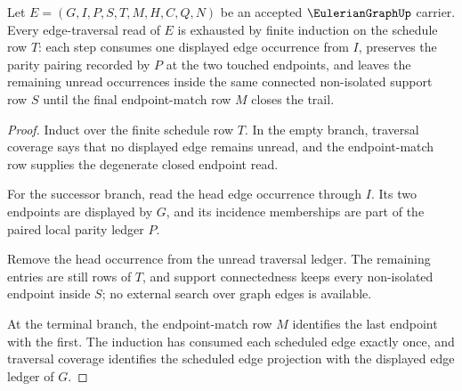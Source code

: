 \begin{theorem}
\label{thm:eulerian-graph-even-degree-trail-exhaustion}
Let $E=(G,I,P,S,T,M,H,C,Q,N)$ be an accepted $\EulerianGraphUp$ carrier. Every edge-traversal read of $E$ is exhausted by finite induction on the schedule row $T$: each step consumes one displayed edge occurrence from $I$, preserves the parity pairing recorded by $P$ at the two touched endpoints, and leaves the remaining unread occurrences inside the same connected non-isolated support row $S$ until the final endpoint-match row $M$ closes the trail.
\end{theorem}
\begin{proof}
Induct over the finite schedule row $T$. In the empty branch, traversal coverage says that no displayed edge remains unread, and the endpoint-match row supplies the degenerate closed endpoint read.

For the successor branch, read the head edge occurrence through $I$. Its two endpoints are displayed by $G$, and its incidence memberships are part of the paired local parity ledger $P$.

Remove the head occurrence from the unread traversal ledger. The remaining entries are still rows of $T$, and support connectedness keeps every non-isolated endpoint inside $S$; no external search over graph edges is available.

At the terminal branch, the endpoint-match row $M$ identifies the last endpoint with the first. The induction has consumed each scheduled edge exactly once, and traversal coverage identifies the scheduled edge projection with the displayed edge ledger of $G$.
\end{proof}

